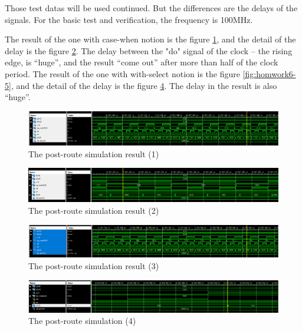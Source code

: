 \documentclass{article}
\begin{document}
    Those test datas will be used continued. But the differences are the delays of the signals.
    For the basic test and verification, the frequency is 100MHz.

    The result of the one with case-when notion is the figure \ref{fig:homework6-3}, and the detail 
    of the delay is the figure \ref{fig:homework6-4}. The delay between the "do" signal of the clock
    -- the rising edge, is ``huge'', and the result ``come out'' after more than half of the clock period. 
    The result of the one with with-select notion is the figure \ref{fig:homwork6-5}, and the detail
    of the delay is the figure \ref{fig:homework6-6}. The delay in the result is also ``huge''.

      \begin{figure}
        \centering
        \includegraphics[width=1\linewidth]{homework6-3}
        \caption{The post-route simulation result (1)}
        \label{fig:homework6-3}
      \end{figure}

      \begin{figure}
        \centering
        \includegraphics[width=1\linewidth]{homework6-4}
        \caption{The post-route simulation result (2)}
        \label{fig:homework6-4}
      \end{figure}

      \begin{figure}
        \centering
        \includegraphics[width=1\linewidth]{homework6-5}
        \caption{The post-route simulation result (3)}
        \label{fig:homework6-5}
      \end{figure}

      \begin{figure}
        \centering
        \includegraphics[width=1\linewidth]{homework6-6}
        \caption{The post-route simulation (4)}
        \label{fig:homework6-6}
      \end{figure}
\end{document}
